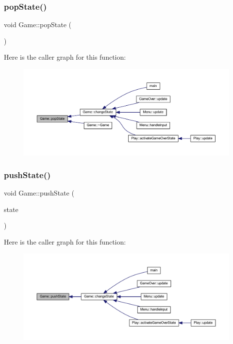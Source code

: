 \subsubsection{\texorpdfstring{pop\+State()}{popState()}}
{\footnotesize\ttfamily void Game\+::pop\+State (\begin{DoxyParamCaption}{ }\end{DoxyParamCaption})}

Here is the caller graph for this function\+:
\nopagebreak
\begin{figure}[H]
\begin{center}
\leavevmode
\includegraphics[width=350pt]{class_game_a4b33dd67adef59bebadba8a234282c88_icgraph}
\end{center}
\end{figure}
\mbox{\label{class_game_a5898f1edb6e3bc1700b2ffb1943bc609}} 
\subsubsection{\texorpdfstring{push\+State()}{pushState()}}
{\footnotesize\ttfamily void Game\+::push\+State (\begin{DoxyParamCaption}\item[{\hyperlink{class_game_state}{Game\+State} $\ast$}]{state }\end{DoxyParamCaption})}

Here is the caller graph for this function\+:
\nopagebreak
\begin{figure}[H]
\begin{center}
\leavevmode
\includegraphics[width=350pt]{class_game_a5898f1edb6e3bc1700b2ffb1943bc609_icgraph}
\end{center}
\end{figure}


